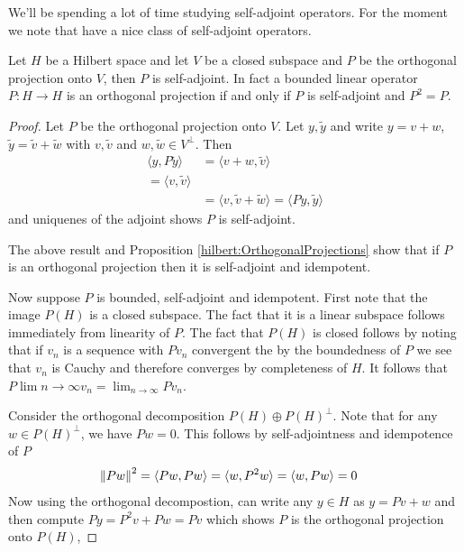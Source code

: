 We'll be spending a lot of time studying self-adjoint operators.   For
the moment we note that have a nice class of self-adjoint operators.
\begin{prop}\label{hilbert:ProjectionsAreSelfAdjoint}Let $H$ be a
  Hilbert space and let $V$ be a closed subspace and $P$ be the
  orthogonal projection onto $V$, then $P$ is self-adjoint.   In fact
  a bounded linear operator $P : H \to H$ is an orthogonal projection
  if and only if $P$ is self-adjoint and $P^2 = P$.
\end{prop}
\begin{proof}
  Let $P$ be the orthogonal projection onto $V$.   Let $y, \tilde{y}$
  and write $y = v + w$, $\tilde{y} = \tilde{v} + \tilde{w}$ with $v,
  \tilde{v}$ and $w, \tilde{w} \in V^\perp$.   Then
  \begin{align*}
    \langle y, P \tilde{y} \rangle
    &= \langle v + w, \tilde{v} \rangle \\
    = \langle v , \tilde{v} \rangle \\
    &= \langle v, \tilde{v} + \tilde{w} \rangle = \langle P y,
      \tilde{y} \rangle
  \end{align*}
  and uniquenes of the adjoint shows $P$ is self-adjoint.

  The above result and Proposition \ref{hilbert:OrthogonalProjections}
  show that if $P$ is an orthogonal projection then it is self-adjoint
  and idempotent.

  Now suppose $P$ is bounded, self-adjoint and idempotent.  First note
  that the image $P(H)$ is a closed subspace.   The fact that it is a
  linear subspace follows immediately from linearity of $P$.  The fact
  that $P(H)$ is closed follows by noting that if $v_n$ is a sequence
  with $Pv_n$ convergent the by the boundedness of $P$ we see that
  $v_n$ is Cauchy and therefore converges by completeness of $H$.   It
  follows that $P \lim{n \to \infty} v_n = \lim_{n \to \infty} P v_n$.

  Consider the orthogonal decomposition $P(H) \oplus
  P(H)^\perp$.   Note that for any $w \in  P(H)^\perp$, we have $P w =
  0$.   This follows by self-adjointness and idempotence of $P$ 
  \begin{align*}
    \left \lVert Pw \right \rVert^2 &= \langle  Pw, Pw \rangle = \langle  w, P^2w \rangle
                  = \langle  w, P w \rangle = 0
  \end{align*}
  Now using the orthogonal decompostion, can write any $y \in H$ as $y
  = Pv + w$ and then compute $Py = P^2v + Pw = Pv$ which shows $P$ is
  the orthogonal projection onto $P(H)$,
\end{proof}
